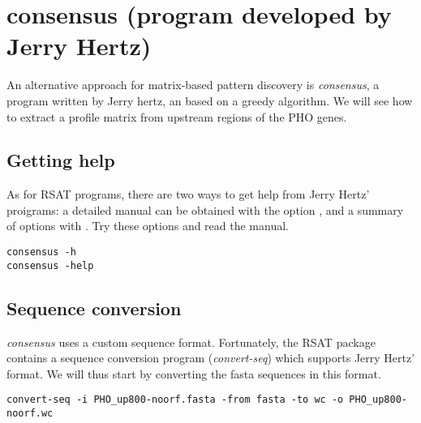 \tbw





\section{consensus (program developed by Jerry Hertz)}

An alternative approach for matrix-based pattern discovery is
\textit{consensus}, a program written by Jerry hertz, an based on a
greedy algorithm. We will see how to extract a profile matrix from
upstream regions of the PHO genes.

\subsection{Getting help}

As for RSAT programs, there are two ways to get help from Jerry Hertz'
proigrams: a detailed manual can be obtained with the option
, and a summary of options with . Try these
options and read the manual.

{\color{Blue} \begin{footnotesize} 
\begin{verbatim}
consensus -h
consensus -help
\end{verbatim} \end{footnotesize}
}


\subsection{Sequence conversion}


\textit{consensus} uses a custom sequence format. Fortunately, the RSAT
package contains a sequence conversion program (\textit{convert-seq})
which supports Jerry Hertz' format. We will thus start by converting
the fasta sequences in this format. 

{\color{Blue} \begin{footnotesize} 
\begin{verbatim}
convert-seq -i PHO_up800-noorf.fasta -from fasta -to wc -o PHO_up800-noorf.wc
\end{verbatim} \end{footnotesize}
}


